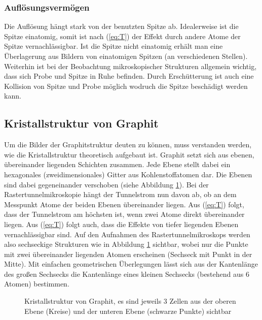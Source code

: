 \subsubsection{Auflösungsvermögen}
Die Auflösung hängt stark von der benutzten Spitze ab. Idealerweise ist die Spitze einatomig, somit ist nach (\ref{eq:T}) der Effekt durch andere Atome der Spitze vernachlässigbar. Ist die Spitze nicht einatomig erhält man eine Überlagerung aus Bildern von einatomigen Spitzen (an verschiedenen Stellen). Weiterhin ist bei der Beobachtung mikroskopischer Strukturen allgemein wichtig, dass sich Probe und Spitze in Ruhe befinden. Durch Erschütterung ist auch eine Kollision von Spitze und Probe möglich wodruch die Spitze beschädigt werden kann.

\subsection{Kristallstruktur von Graphit}
Um die Bilder der Graphitstruktur deuten zu können, muss verstanden werden, wie die Kristallstruktur theoretisch aufgebaut ist. Graphit setzt sich aus ebenen, übereinander liegenden Schichten zusammen. Jede Ebene stellt dabei ein hexagonales (zweidimensionales) Gitter aus Kohlenstoffatomen dar. Die Ebenen sind dabei gegeneinander verschoben (siehe Abbildung \ref{fig:Graphit}). Bei der Rastertunnelmikroskopie hängt der Tunnelstrom nun davon ab, ob an dem Messpunkt Atome der beiden Ebenen übereinander liegen. Aus (\ref{eq:T}) folgt, dass der Tunnelstrom am höchsten ist, wenn zwei Atome direkt übereinander liegen. Aus (\ref{eq:T}) folgt auch, dass die Effekte von tiefer liegenden Ebenen vernachlässigbar sind. Auf den Aufnahmen des Rastertunnelmikroskops werden also sechseckige Strukturen wie in Abbildung \ref{fig:Graphit} sichtbar, wobei nur die Punkte mit zwei übereinander liegenden Atomen erscheinen (Sechseck mit Punkt in der Mitte). Mit einfachen geometrischen Überlegungen lässt sich aus der Kantenlänge des großen Sechsecks die Kantenlänge eines kleinen Sechsecks (bestehend aus 6 Atomen) bestimmen.   

\begin{figure}[h]
  \centering
  \caption{Kristallstruktur von Graphit, es sind jeweils 3 Zellen aus der oberen Ebene (Kreise) und der unteren Ebene (schwarze Punkte) sichtbar}
  \label{fig:Graphit}
\end{figure}

             

